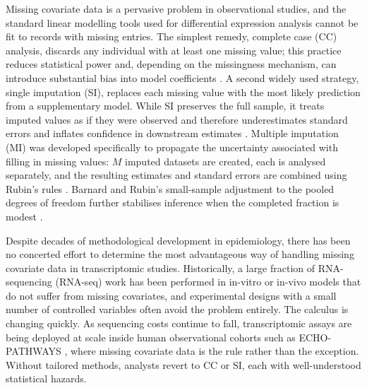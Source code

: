 \documentclass[11pt]{article}
\begin{document}
Missing covariate data is a pervasive problem in observational studies, and the standard linear modelling tools used for differential expression analysis cannot be fit to records with missing entries. The simplest remedy, complete case (CC) analysis, discards any individual with at least one missing value; this practice reduces statistical power and, depending on the missingness mechanism, can introduce substantial bias into model coefficients \citep{sterne2009multiple,little2019statistical}. A second widely used strategy, single imputation (SI), replaces each missing value with the most likely prediction from a supplementary model. While SI preserves the full sample, it treats imputed values as if they were observed and therefore underestimates standard errors and inflates confidence in downstream estimates \citep{rubin1987multiple,sterne2009multiple}. Multiple imputation (MI) was developed specifically to propagate the uncertainty associated with filling in missing values: $M$ imputed datasets are created, each is analysed separately, and the resulting estimates and standard errors are combined using Rubin's rules \citep{rubin1987multiple,marshall2009combining}. Barnard and Rubin's small-sample adjustment to the pooled degrees of freedom further stabilises inference when the completed fraction is modest \citep{barnard1999smalls}.

Despite decades of methodological development in epidemiology, there has been no concerted effort to determine the most advantageous way of handling missing covariate data in transcriptomic studies. Historically, a large fraction of RNA-sequencing (RNA-seq) work has been performed in in-vitro or in-vivo models that do not suffer from missing covariates, and experimental designs with a small number of controlled variables often avoid the problem entirely. The calculus is changing quickly. As sequencing costs continue to fall, transcriptomic assays are being deployed at scale inside human observational cohorts such as ECHO-PATHWAYS \citep{paulson2022lewinn,paquette2023placental}, where missing covariate data is the rule rather than the exception. Without tailored methods, analysts revert to CC or SI, each with well-understood statistical hazards.
\end{document}
